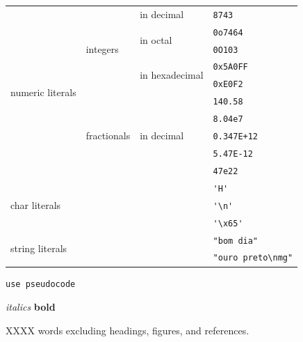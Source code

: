 \documentclass[11pt]{article} %
\begin{document}
\begin{tabular}{|l|l|l|l|}\hline
  \multirow{10}{*}{numeric literals} 				& \multirow{5}{*}{integers} 	& in decimal 					& \verb|8743| \\ \cline{3-4}
  					    				& 				       	& \multirow{2}{*}{in octal}   		& \verb|0o7464| \\ \cline{4-4}
  					    				& 					& 						& \verb|0O103| \\ \cline{3-4}
  					    				& 					& \multirow{2}{*}{in hexadecimal}	& \verb|0x5A0FF| \\ \cline{4-4}
 				 	    				& 					& 						& \verb|0xE0F2| \\ \cline{2-4}
  					    				& \multirow{5}{*}{fractionals} 	& \multirow{5}{*}{in decimal} 		& \verb|140.58| \\ \cline{4-4}
 				 					& 					& 						& \verb|8.04e7| \\ \cline{4-4}
  									& 					& 						& \verb|0.347E+12| \\ \cline{4-4}
  									& 					& 						& \verb|5.47E-12| \\ \cline{4-4}
  									& 					& 						& \verb|47e22| \\ \cline{1-4}
  \multicolumn{3}{|l|}{\multirow{3}{*}{char literals}} 													& \verb|'H'| \\ \cline{4-4}
  \multicolumn{3}{|l|}{} 																	& \verb|'\n'| \\ \cline{4-4}          %
  \multicolumn{3}{|l|}{} 																	& \verb|'\x65'| \\ \cline{1-4}        %
  \multicolumn{3}{|l|}{\multirow{2}{*}{string literals}} 												& \verb|"bom dia"| \\ \cline{4-4}
  \multicolumn{3}{|l|}{} 																	& \verb|"ouro preto\nmg"| \\ \cline{1-4}          %
\end{tabular}




\begin{verbatim}
use pseudocode
\end{verbatim}

\textit{italics}
\textbf{bold}

XXXX words excluding headings, figures, and references. \\

\nocite{*}

\medskip


\printbibliography
\end{document}
